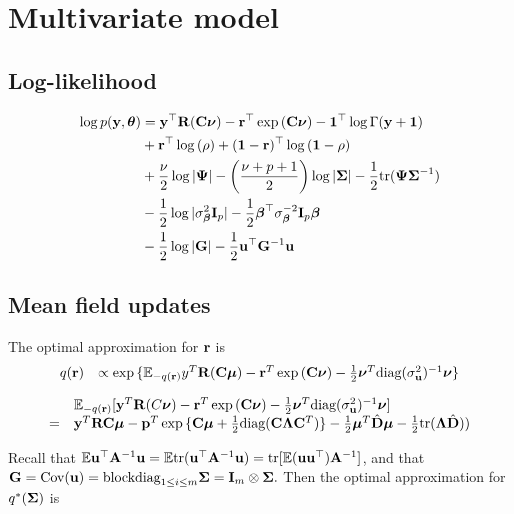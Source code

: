 \documentclass[11pt]{amsart}
\begin{document}
\section{Multivariate model}
\subsection{Log-likelihood}
\begin{align*}
	\log p({\bf y}, {\boldsymbol \theta}) & = {\bf y}^\top {\bf R}({\bf C} {\boldsymbol \nu}) - {\bf r}^\top \exp{({\bf C}{\boldsymbol\nu})} - {\bf 1}^\top \log \Gamma({\bf y} + {\bf 1})                                 \\
	                     & + {\bf r}^\top \log{(\rho)} + ({\bf 1} - {\bf r})^\top \log{({\bf1}- \rho)}                                                          \\
	                     & + \frac{\nu}{2} \log |{\boldsymbol \Psi}| - \left( \frac{\nu + p + 1}{2} \right) \log{|{\boldsymbol\Sigma}|} - \frac{1}{2} \text{tr} ({\boldsymbol \Psi} {\boldsymbol \Sigma}^{-1}) \\
	                     & - \frac{1}{2} \log{|\sigma^2_{\boldsymbol\beta}{\bf I}_p|} - \frac{1}{2} {\boldsymbol \beta}^\top \sigma_{\boldsymbol \beta}^{-2} {\bf I}_p {\boldsymbol \beta}                      \\
	                     & -\frac{1}{2} \log |{\bf G}| - \frac{1}{2} {\bf u}^\top {\bf G}^{-1} {\bf u}                                                                
\end{align*}

\subsection{Mean field updates}
\noindent The optimal approximation for ${\bf r}$ is
$$
\begin{array}{rl}
	q({\bf r}) & \propto \exp{\{{\mathbb E}_{-q({\bf r})}y^T{\bf R}({\bf C}{\boldsymbol\mu}) - {\bf r}^T\exp{({\bf C}{\boldsymbol\nu})}- \tfrac{1}{2} {\boldsymbol\nu}^T \text{diag}(\sigma_{{\bf u}}^2)^{-1} {\boldsymbol\nu}\}} 
\end{array}
$$

$$
\begin{array}{rl}
	  & {\mathbb E}_{-q({\bf r})} [{\bf y}^T{\bf R}(C{\boldsymbol \nu}) - {\bf r}^T\exp{({\bf C}{\boldsymbol\nu})}-\tfrac{1}{2} {\boldsymbol \nu}^T \text{diag}(\sigma_{{\bf u}}^2)^{-1} {\boldsymbol \nu}]                                                 \\
	= & {\bf y}^T{\bf R}{\bf C} {\boldsymbol \mu} - {\bf p}^T \exp{\{{\bf C}{\boldsymbol\mu}+  \tfrac{1}{2} \text{diag}({\bf C}{\boldsymbol\Lambda}{\bf C}^T)\}} - \tfrac{1}{2} {\boldsymbol \mu}^T \hat{{\bf D}} {\boldsymbol \mu} - \tfrac{1}{2} \text{tr}({\boldsymbol \Lambda} \hat{{\bf D}} )) 
\end{array}
$$

Recall that $\mathbb{E} {\bf u}^\top {\bf A}^{-1} {\bf u} = \mathbb{E} \text{tr}({\bf u}^\top {\bf A}^{-1} {\bf u}) = \text{tr} [\mathbb{E} ({\bf u} {\bf u}^\top) {\bf A}^{-1}]$, and
that ${\bf G} = \text{Cov}({\bf u}) = \text{blockdiag}_{1 \leq i \leq m} {\boldsymbol \Sigma} = {\bf I}_m \otimes {\boldsymbol\Sigma}.$ Then the
optimal approximation for $q^*({\boldsymbol \Sigma})$ is
\end{document}
